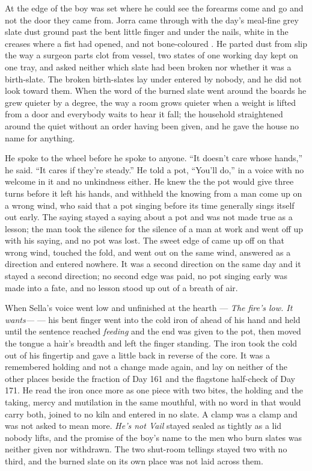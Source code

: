 \scenebreak

At the edge of  the boy was set where he could see the forearms come and go and not the door they came from. Jorra came through with the day's meal-fine grey slate dust ground past the bent little finger and under the nails, white in the creases where a fist had opened, and not bone-coloured . He parted dust from slip the way a surgeon parts clot from vessel, two states of one working day kept on one tray, and asked neither which slate had been broken nor whether it was a birth-slate. The broken birth-slates lay under  entered by nobody, and he did not look toward them. When the word of the burned slate went around the boards he grew quieter by a degree, the way a room grows quieter when a weight is lifted from a door and everybody waits to hear it fall; the household straightened around the quiet without an order having been given, and he gave the house no name for anything.

He spoke to the wheel before he spoke to anyone. “It doesn't care whose hands,” he said. “It cares if they're steady.” He told a pot, “You'll do,” in a voice with no welcome in it and no unkindness either. He knew the  the pot would give three turns before it left his hands, and withheld the knowing from a man come up on a wrong wind, who said that a pot singing before its time generally sings itself out early. The saying stayed a saying about a pot and was not made true as a lesson; the man took the silence for the silence of a man at work and went off up  with his saying, and no pot was lost. The sweet edge of  came up off  on that wrong wind, touched the fold, and went out on the same wind, answered as a direction and entered nowhere. It was a second direction on the same day and it stayed a second direction; no second edge was paid, no pot singing early was made into a fate, and no lesson stood up out of a breath of air.

When Sella's voice went low and unfinished at the hearth --- \emph{The fire's low. It wants---} --- his bent finger went into the cold iron of  ahead of his hand and held until the sentence reached \emph{feeding} and the end was given to the pot, then moved the tongue a hair's breadth and left the finger standing. The iron took the cold out of his fingertip and gave a little back in reverse of the core. It was a remembered holding and not a change made again, and lay on neither of the other places beside the fraction of Day 161 and the flagstone half-check of Day 171. He read the iron once more as one piece with two bites, the holding and the taking, mercy and mutilation in the same mouthful, with no word in  that would carry both, joined to no kiln and entered in no slate. A clamp was a clamp and was not asked to mean more. \emph{He's not Vail} stayed sealed as tightly as a lid nobody lifts, and the promise of the boy's name to the men who burn slates was neither given nor withdrawn. The two shut-room tellings stayed two with no third, and the burned slate on its own place was not laid across them.

